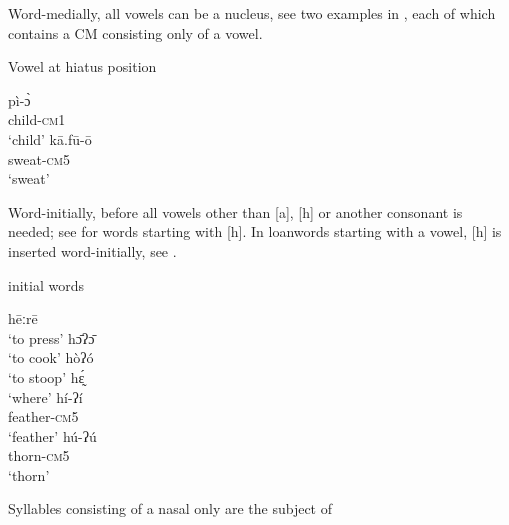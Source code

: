 \documentclass[output=paper]{langscibook}
\begin{document}
Word-medially, all vowels can be a nucleus, see two examples in , each of which contains a CM consisting only of a vowel.\largerpage[2]

 \begin{exe}\setlength\multicolsep{0pt}
     \ex \label{ex:traore:VowelHiatusPosition:6}Vowel at hiatus position
     \begin{multicols}{2}\raggedcolumns
     \begin{xlist}
         \ex \gll pì-ɔ̀ \\
            child-\textsc{cm1}\\
        \trans `child'
        \columnbreak\ex \gll kā.fū-ō \\
             sweat-\textsc{cm5}\\
             \trans `sweat'
     \end{xlist}
     \end{multicols}
 \end{exe}
        

Word-initially, before all vowels other than [a], [h] or another consonant is needed; see  for words starting with [h].  In loanwords starting with a vowel, [h] is inserted word-initially, see .

 \begin{exe}\setlength\multicolsep{0pt}
     \ex {[h]} initial words \label{ex:traore:hInitialWords:7}
     \begin{multicols}{2}\raggedcolumns
     \begin{xlist}
         \ex hēːrē\\
            `to press'
        \ex  hɔ̄ʔɔ̄  \\
            `to cook'
        \ex hòʔó \\
            `to stoop'
        \columnbreak
        \ex  hɛ̰́   \\
            `where'
        \ex \gll hí-ʔí\\
            feather-\textsc{cm5}\\
            \trans `feather'
        \ex  \gll hú-ʔú \\
            thorn-\textsc{cm5}\\
            \trans `thorn'
     \end{xlist}
     \end{multicols}
 \end{exe}

Syllables consisting of a nasal only are the subject of 
\end{document}
